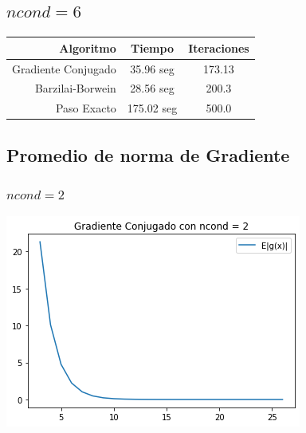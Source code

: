 \documentclass[11pt,letterpaper]{article}
\theoremstyle{definition}
\theoremstyle{definition}
\theoremstyle{definition}
\begin{document}
\subsection{$ ncond = 6 $}
\begin{center}
	\begin{tabular}{rcc}
		\hline
		\hline
		Algoritmo          &  Tiempo  & Iteraciones \\
		\hline
		\hline
		Gradiente Conjugado & 35.96    seg & 173.13           \\
		Barzilai-Borwein    & 28.56    seg & 200.3            \\
		Paso Exacto         & 175.02   seg & 500.0            \\
		\hline
	\end{tabular}
\end{center}

\subsection{Promedio de norma de Gradiente}
\subsubsection{$ ncond = 2 $}
\begin{center}
	\includegraphics[width=0.7\linewidth]{graficas/gc_2}
\end{center}
\end{document}
